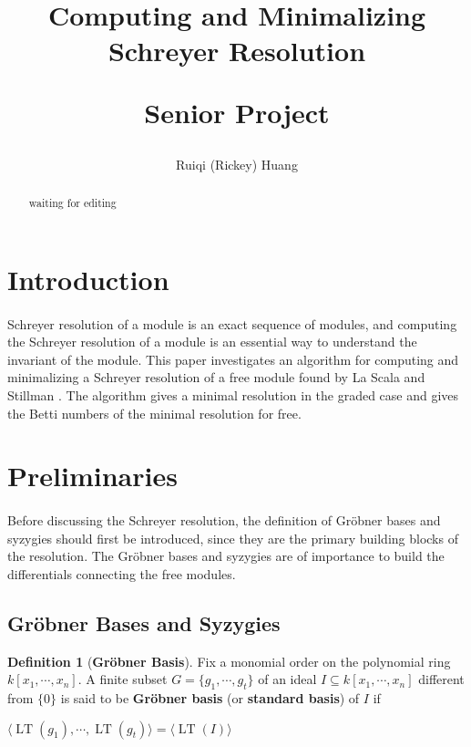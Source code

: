 \documentclass{article}
\title{Computing and Minimalizing Schreyer Resolution\\
\begin{large} 
  Senior Project
\end{large}}
\author{Ruiqi (Rickey) Huang}
\newcommand{\lt}{\ensuremath{\operatorname{LT}}}
\theoremstyle{definition}
\newtheorem{definition}{Definition}[section]
\theoremstyle{remark}
\theoremstyle{example}
\begin{document}
\maketitle

\begin{abstract}
    \textcolor{BrickRed}{waiting for editing}
\end{abstract}

\section{Introduction}

\paragraph{  }

Schreyer resolution of a module is an exact sequence of modules, and computing the Schreyer resolution of a module is an essential way to understand the invariant of the module. This paper investigates an algorithm for computing and minimalizing a Schreyer resolution of a free module found by La Scala and Stillman \cite{la_scala_strategies_1998}. The algorithm gives a minimal resolution in the graded case and gives the Betti numbers of the minimal resolution for free.

\section{Preliminaries}

\paragraph{  }

Before discussing the Schreyer resolution, the definition of Gröbner bases and syzygies should first be introduced, since they are the primary building blocks of the resolution. The Gröbner bases and syzygies are of importance to build the differentials connecting the free modules.

\subsection{Gröbner Bases and Syzygies}

\begin{definition}[\textbf{Gröbner Basis}]\cite{cox_grobner_2015}\label{def:gb}
    Fix a monomial order on the polynomial ring $k[x_1, \cdots, x_n]$. A finite subset $G = \{g_1, \cdots, g_t\}$ of an ideal $I \subseteq k[x_1, \cdots, x_n]$ different from $\{0\}$ is said to be \textbf{Gröbner basis} (or \textbf{standard basis}) of $I$ if
    \begin{center}
        $\langle \lt(g_1), \cdots, \lt(g_t)\rangle = \langle \lt(I) \rangle$
    \end{center}
\end{definition}
\end{document}
